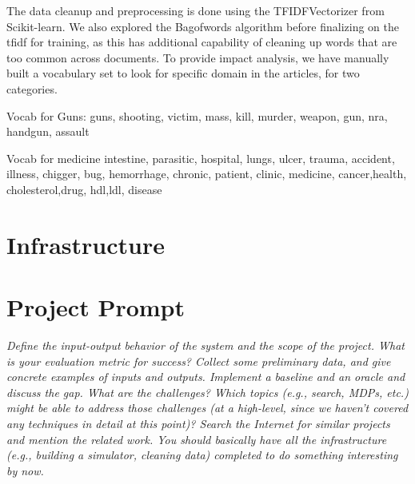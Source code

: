 \documentclass{article}
\begin{document}
The data cleanup and preprocessing is done using the TFIDFVectorizer from Scikit-learn.
We also explored the Bagofwords algorithm before finalizing on the tfidf for training, as this has additional capability of cleaning up words that are too common across documents.
To provide impact analysis, we have manually built a vocabulary set to look for specific domain in the articles, for two categories.

Vocab for Guns:
guns, shooting, victim, mass, kill, murder, weapon, gun, nra, handgun, assault

Vocab for medicine
intestine, parasitic, hospital, lungs, ulcer, trauma, accident, illness, chigger, bug, hemorrhage, chronic, patient, clinic, medicine, cancer,health, cholesterol,drug, hdl,ldl, disease
\maketitle %


\section*{Infrastructure} %

\section*{Project Prompt}

\textit{Define the input-output behavior of the system and the scope of the project. What is your evaluation metric for success? Collect some preliminary data, and give concrete examples of inputs and outputs. Implement a baseline and an oracle and discuss the gap. What are the challenges? Which topics (e.g., search, MDPs, etc.) might be able to address those challenges (at a high-level, since we haven't covered any techniques in detail at this point)? Search the Internet for similar projects and mention the related work. You should basically have all the infrastructure (e.g., building a simulator, cleaning data) completed to do something interesting by now.}
\end{document}
